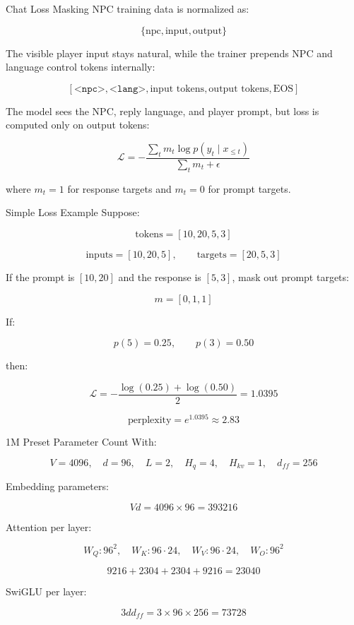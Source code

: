 \documentclass[aspectratio=169]{beamer}
\begin{document}
\begin{frame}{Chat Loss Masking}
  NPC training data is normalized as:

  \[
    \{\text{npc},\text{input},\text{output}\}
  \]

  The visible player input stays natural, while the trainer prepends NPC and
  language control tokens internally:

  \[
    [\texttt{<npc>},\texttt{<lang>},\text{input tokens},\text{output tokens},\text{EOS}]
  \]

  The model sees the NPC, reply language, and player prompt, but loss is
  computed only on output tokens:

  \[
    \mathcal{L}
    =
    -\frac{
      \sum_t m_t \log p(y_t \mid x_{\le t})
    }{
      \sum_t m_t + \epsilon
    }
  \]

  where \(m_t = 1\) for response targets and \(m_t = 0\) for prompt targets.
\end{frame}

\begin{frame}{Simple Loss Example}
  Suppose:

  \[
    \text{tokens} = [10, 20, 5, 3]
  \]

  \[
    \text{inputs} = [10, 20, 5],
    \qquad
    \text{targets} = [20, 5, 3]
  \]

  If the prompt is \([10,20]\) and the response is \([5,3]\), mask out prompt
  targets:

  \[
    m = [0, 1, 1]
  \]

  If:

  \[
    p(5)=0.25,\qquad p(3)=0.50
  \]

  then:

  \[
    \mathcal{L}
    =
    -\frac{\log(0.25)+\log(0.50)}{2}
    =
    1.0395
  \]

  \[
    \text{perplexity} = e^{1.0395} \approx 2.83
  \]
\end{frame}

\begin{frame}{1M Preset Parameter Count}
  With:

  \[
    V=4096,\quad d=96,\quad L=2,\quad H_q=4,\quad H_{kv}=1,\quad d_{ff}=256
  \]

  Embedding parameters:

  \[
    Vd = 4096 \times 96 = 393216
  \]

  Attention per layer:

  \[
    W_Q:96^2,\quad W_K:96\cdot24,\quad W_V:96\cdot24,\quad W_O:96^2
  \]

  \[
    9216 + 2304 + 2304 + 9216 = 23040
  \]

  SwiGLU per layer:

  \[
    3dd_{ff} = 3 \times 96 \times 256 = 73728
  \]
\end{frame}
\end{document}
